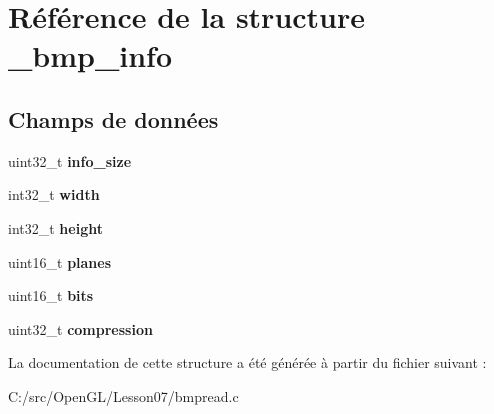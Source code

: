 \hypertarget{struct__bmp__info}{}\section{Référence de la structure \+\_\+bmp\+\_\+info}
\label{struct__bmp__info}
\subsection*{Champs de données}
\begin{DoxyCompactItemize}
\item 
\hypertarget{struct__bmp__info_a703e4b1499f66b16fad1afb18c2e18fc}{}uint32\+\_\+t {\bfseries info\+\_\+size}\label{struct__bmp__info_a703e4b1499f66b16fad1afb18c2e18fc}

\item 
\hypertarget{struct__bmp__info_a395d15e7c2b09961c1bfd1da6179b64c}{}int32\+\_\+t {\bfseries width}\label{struct__bmp__info_a395d15e7c2b09961c1bfd1da6179b64c}

\item 
\hypertarget{struct__bmp__info_a5d8006e753a3e76ff637a4e092bbed71}{}int32\+\_\+t {\bfseries height}\label{struct__bmp__info_a5d8006e753a3e76ff637a4e092bbed71}

\item 
\hypertarget{struct__bmp__info_a5f6caf51b5ce3eb6fc340a667126406b}{}uint16\+\_\+t {\bfseries planes}\label{struct__bmp__info_a5f6caf51b5ce3eb6fc340a667126406b}

\item 
\hypertarget{struct__bmp__info_a0c1105f0af8d3db3f02c6174eb15a79a}{}uint16\+\_\+t {\bfseries bits}\label{struct__bmp__info_a0c1105f0af8d3db3f02c6174eb15a79a}

\item 
\hypertarget{struct__bmp__info_aa379ffab5097352ba49ec9358c38cf4e}{}uint32\+\_\+t {\bfseries compression}\label{struct__bmp__info_aa379ffab5097352ba49ec9358c38cf4e}

\end{DoxyCompactItemize}


La documentation de cette structure a été générée à partir du fichier suivant \+:\begin{DoxyCompactItemize}
\item 
C\+:/src/\+Open\+G\+L/\+Lesson07/bmpread.\+c\end{DoxyCompactItemize}
